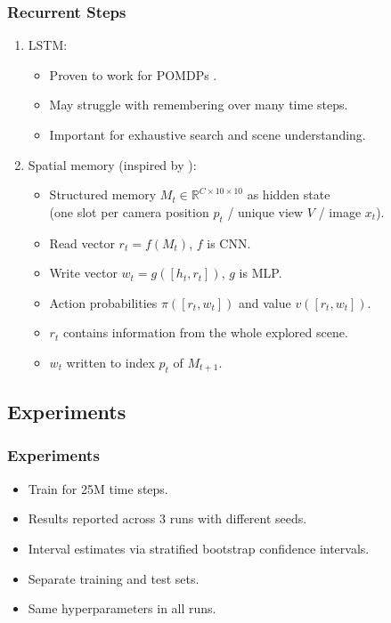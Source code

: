 \begin{frame}
    \frametitle{Recurrent Steps}

    \begin{enumerate}
        \item LSTM:
        \begin{itemize}
            \item Proven to work for POMDPs \cite{hausknecht_stone_2017,mnih_asynchronous_2016,mirowski_navigate_2017,gupta_cognitive_2019}.
            \item May struggle with remembering over many time steps.
            \item Important for exhaustive search and scene understanding.
        \end{itemize}
        \item Spatial memory (inspired by \cite{parisotto_salakhutdinov_2017}):
        \begin{itemize}
            \item Structured memory \(M_t \in \mathbb{R}^{C \times 10 \times 10}\) as hidden state \\
            (one slot per camera position \(p_t\) / unique view \(V\) / image \(x_t\)).
            \item Read vector \(r_t = f(M_t)\), \(f\) is CNN.
            \item Write vector \(w_t = g(\left\lbrack h_t, r_t \right\rbrack)\), \(g\) is MLP.
            \item Action probabilities \(\pi(\left\lbrack r_t, w_t \right\rbrack)\) and value \(v(\left\lbrack r_t, w_t \right\rbrack)\).
            \item \(r_t\) contains information from the whole explored scene.
            \item \(w_t\) written to index \(p_t\) of \(M_{t+1}\).
        \end{itemize}
    \end{enumerate}
\end{frame}

\subsection{Experiments}

\begin{frame}
    \frametitle{Experiments}

    \begin{itemize}
        \item Train for 25M time steps.
        \item Results reported across 3 runs with different seeds.
        \item Interval estimates via stratified bootstrap confidence intervals.
        \item Separate training and test sets.
        \item Same hyperparameters in all runs.
    \end{itemize}
\end{frame}

